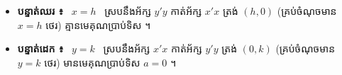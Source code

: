 \documentclass[theme=teal]{khmermath}
\newcommand{\koreahl}[1]{\colorbox{koreaYellow}{\fontsize{8.5}{8.5}\selectfont\textbf{#1}}}
\begin{document}
\vspace{2pt}

\begin{khboxorange}
  \begin{itemize}[leftmargin=12pt, itemsep=2.5pt, topsep=1pt, parsep=0pt]
    \item[\color{brandNavy}\ding{228}] \textbf{បន្ទាត់ឈរ ៖} \ \koreahl{$x = h$} \ ស្របនឹងអ័ក្ស $y'y$ កាត់អ័ក្ស $x'x$ ត្រង់ $(h, 0)$ (គ្រប់ចំណុចមាន $x=h$ ថេរ) គ្មានមេគុណប្រាប់ទិស ។
    \item[\color{brandCrimson}\ding{228}] \textbf{បន្ទាត់ដេក ៖} \ \koreahl{$y = k$} \ ស្របនឹងអ័ក្ស $x'x$ កាត់អ័ក្ស $y'y$ ត្រង់ $(0, k)$ (គ្រប់ចំណុចមាន $y=k$ ថេរ) មានមេគុណប្រាប់ទិស $a = 0$ ។
  \end{itemize}
\end{khboxorange}

\vspace{2pt}
\end{document}
